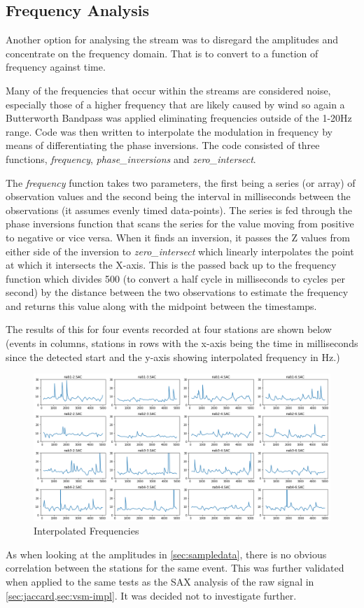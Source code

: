 \documentclass[../report.tex]{subfiles}
\begin{document}
\subsection{Frequency Analysis}
	Another option for analysing the stream was to disregard the amplitudes and concentrate on the frequency domain.  That is to convert to a function of frequency against time.
	
	Many of the frequencies that occur within the streams are considered noise, especially those of a higher frequency that are likely caused by wind so again a Butterworth Bandpass \citep{bandpass} was applied eliminating frequencies outside of the 1-20Hz range.  Code was then written to interpolate the modulation in frequency by means of differentiating the phase inversions.  The code consisted of three functions, \textit{frequency}, \textit{phase\_inversions} and \textit{zero\_intersect}.
	
	The \textit{frequency} function takes two parameters, the first being a series (or array) of observation values and the second being the interval in milliseconds between the observations (it assumes evenly timed data-points).  The series is fed through the phase inversions function that scans the series for the value moving from positive to negative or vice versa.  When it finds an inversion, it passes the Z values from either side of the inversion to \textit{zero\_intersect} which linearly interpolates the point at which it intersects the X-axis.  This is the passed back up to the frequency function which divides 500 (to convert a half cycle in milliseconds to cycles per second) by the distance between the two observations to estimate the frequency and returns this value along with the midpoint between the timestamps.
	
	The results of this for four events recorded at four stations are shown below (events in columns, stations in rows with the x-axis being the time in milliseconds since the detected start and the y-axis showing interpolated frequency in Hz.)

\begin{figure}[H]
	\centering
	\includegraphics[width=1\linewidth]{img/freq_anal}
	\caption{Interpolated Frequencies}
	\label{fig:freq_anal}
\end{figure}

	As when looking at the amplitudes in \cref{sec:sampledata}, there is no obvious correlation between the stations for the same event.  This was further validated when applied to the same tests as the SAX analysis of the raw signal in \cref{sec:jaccard,sec:vsm-impl}. It was decided not to investigate further.   
\end{document}
